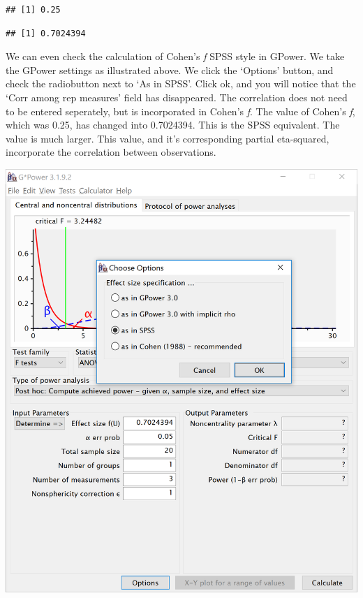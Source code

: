 \documentclass[
]{book}
\newenvironment{Shaded}{\begin{snugshade}}{\end{snugshade}}
\newcommand{\KeywordTok}[1]{\textcolor[rgb]{0.13,0.29,0.53}{\textbf{#1}}}
\newcommand{\NormalTok}[1]{#1}
\newcommand{\OperatorTok}[1]{\textcolor[rgb]{0.81,0.36,0.00}{\textbf{#1}}}
\begin{document}
\begin{verbatim}
## [1] 0.25
\end{verbatim}

\begin{Shaded}
\end{Shaded}

\begin{verbatim}
## [1] 0.7024394
\end{verbatim}

\newpage

We can even check the calculation of Cohen's \emph{f} SPSS style in GPower. We take the GPower settings as illustrated above. We click the `Options' button, and check the radiobutton next to `As in SPSS'. Click ok, and you will notice that the `Corr among rep measures' field has disappeared. The correlation does not need to be entered seperately, but is incorporated in Cohen's \emph{f}. The value of Cohen's \emph{f}, which was 0.25, has changed into 0.7024394. This is the SPSS equivalent. The value is much larger. This value, and it's corresponding partial eta-squared, incorporate the correlation between observations.

\includegraphics{screenshots/gpower_14.png}
\end{document}
